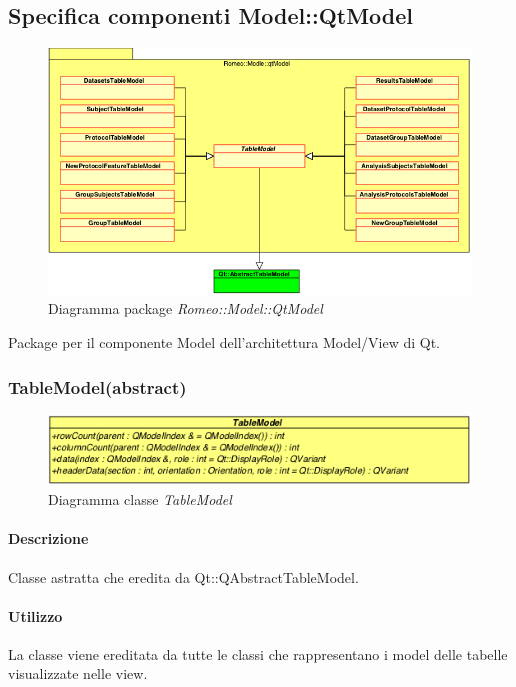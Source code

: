 \color{black}
\subsection{Specifica componenti Model::QtModel}
\label{specificaQtModel}
	\begin{figure}[!h]
		\centering
		\includegraphics[width=\linewidth]{../Specifica_Tecnica/Content/Immagini/Romeo__Model__qtModel.png}
		\caption{Diagramma package \textsl{Romeo::Model::QtModel}}
		\label{comp_romeo_model_qtmodel}
	\end{figure}
	Package\g{} per il componente Model dell'architettura Model/View di Qt\g{}.
	
\subsubsection{TableModel(abstract)}
\label{TableModel}
\begin{figure}[!h]
	\centering
	\includegraphics[width=0.6\linewidth]{./Content/Immagini/QtModel/TableModel.png}
	\caption{Diagramma classe \textsl{TableModel}}
	\label{comp_TableModel}
\end{figure}

\paragraph{Descrizione\\} 
Classe astratta che eredita da Qt::QAbstractTableModel.

\paragraph{Utilizzo\\}
La classe viene ereditata da tutte le classi che rappresentano i model delle tabelle visualizzate nelle view.

